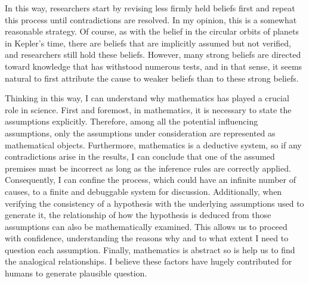 In this way, researchers start by revising less firmly held beliefs first and repeat this process until contradictions are resolved. In my opinion, this is a somewhat reasonable strategy. Of course, as with the belief in the circular orbits of planets in Kepler's time, there are beliefs that are implicitly assumed but not verified, and researchers still hold these beliefs. However, many strong beliefs are directed toward knowledge that has withstood numerous tests, and in that sense, it seems natural to first attribute the cause to weaker beliefs than to these strong beliefs.

Thinking in this way, I can understand why mathematics has played a crucial role in science. First and foremost, in mathematics, it is necessary to state the assumptions explicitly. Therefore, among all the potential influencing assumptions, only the assumptions under consideration are represented as mathematical objects. Furthermore, mathematics is a deductive system, so if any contradictions arise in the results, I can conclude that one of the assumed premises must be incorrect as long as the inference rules are correctly applied. Consequently, I can confine the process, which could have an infinite number of causes, to a finite and debuggable system for discussion. Additionally, when verifying the consistency of a hypothesis with the underlying assumptions used to generate it, the relationship of how the hypothesis is deduced from those assumptions can also be mathematically examined. This allows us to proceed with confidence, understanding the reasons why and to what extent I need to question each assumption. Finally, mathematics is abstract so is help us to find the analogical relationships. I believe these factors have hugely contributed for humans to generate plausible question.




